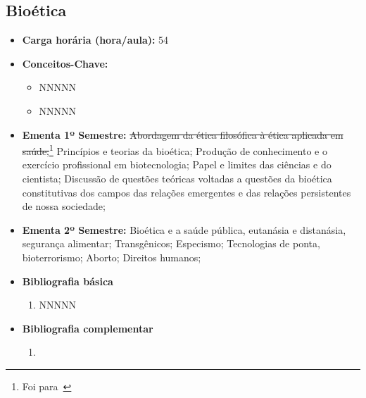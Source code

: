 \documentclass[11pt,fleqn]{book} %
\begin{document}
\subsection{Bioética}\label{disc:bioetica}
\begin{itemize}
	\item \textbf{Carga horária (hora/aula):} 54
	\item \textbf{Conceitos-Chave:}
	\begin{itemize}
		\item NNNNN
		\item NNNNN
	\end{itemize}
	\item \textbf{Ementa 1º Semestre:} 
	\sout{Abordagem da ética filosófica à ética aplicada em saúde;}\footnote{Foi para~}
	Princípios e teorias da bioética;
	Produção de conhecimento e o exercício profissional em biotecnologia; 
	Papel e limites das ciências e do cientista; 
	Discussão de questões teóricas voltadas a questões da bioética constitutivas dos campos das relações emergentes e das relações persistentes de nossa sociedade; 
	\item \textbf{Ementa 2º Semestre:} 
	Bioética e a saúde pública, eutanásia e distanásia, segurança alimentar; 
	Transgênicos; 
	Especismo; 
	Tecnologias de ponta, bioterrorismo; 
	Aborto;
	Direitos humanos;
	\item \textbf{Bibliografia básica}
	\begin{enumerate}
		\item NNNNN
	\end{enumerate}
	\item \textbf{Bibliografia complementar}
	\begin{enumerate}
		\item 
	\end{enumerate}	
\end{itemize}

\newpage
\end{document}
